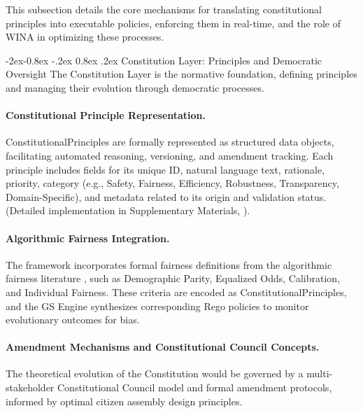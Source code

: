 \documentclass[manuscript,screen,9pt]{acmart}
\makeatletter
\renewcommand\subsubsection{\@startsection{subsubsection}{3}{\z@}%
  {-2ex\@plus -0.8ex \@minus -.2ex}%
  {0.8ex \@plus .2ex}%
  {\normalfont\normalsize\bfseries}}
\makeatother
\begin{document}
This subsection details the core mechanisms for translating constitutional principles into executable policies, enforcing them in real-time, and the role of WINA in optimizing these processes.

\subsubsection{Constitution Layer: Principles and Democratic Oversight}
\label{subsubsec:constitution_layer}
The Constitution Layer is the normative foundation, defining principles and managing their evolution through democratic processes.

\paragraph{Constitutional Principle Representation.} ConstitutionalPrinciples are formally represented as structured data objects, facilitating automated reasoning, versioning, and amendment tracking. Each principle includes fields for its unique ID, natural language text, rationale, priority, category (e.g., Safety, Fairness, Efficiency, Robustness, Transparency, Domain-Specific), and metadata related to its origin and validation status. (Detailed implementation in Supplementary Materials, ).

\paragraph{Algorithmic Fairness Integration.} The framework incorporates formal fairness definitions from the algorithmic fairness literature \cite{Barocas2023FairnessML, Hardt2016EqualityOpportunity, Chouldechova2017FairPrediction, Dwork2012DifferentialPrivacy}, such as Demographic Parity, Equalized Odds, Calibration, and Individual Fairness. These criteria are encoded as ConstitutionalPrinciples, and the GS Engine synthesizes corresponding Rego policies to monitor evolutionary outcomes for bias.

\paragraph{Amendment Mechanisms and Constitutional Council Concepts.} The theoretical evolution of the Constitution would be governed by a multi-stakeholder Constitutional Council model and formal amendment protocols, informed by optimal citizen assembly design principles.
\end{document}
